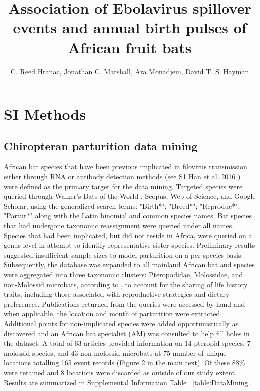 \documentclass[9pt,twoside,lineno]{pnas-new}
\title{Association of Ebolavirus spillover events and annual birth pulses of African fruit bats}
\author{C. Reed Hranac, Jonathan C. Marshall, Ara Monadjem, David T. S. Hayman}
\begin{document}

\maketitle

\SItext


\section*{SI Methods}
\label{SI methods}

\subsection*{Chiropteran parturition data mining}
\label{dataMining}
African bat species that have been previous implicated in filovirus transmission either through RNA or antibody detection methods (see S1 Han et al. 2016 \cite{Han2016UndiscoveredFiloviruses,Walsh2005Wave-likeZaire}) were defined as the primary target for the data mining.
Targeted species were queried through Walker's Bats of the World \cite{Nowak1994WalkersWorld}, Scopus, Web of Science, and Google Scholar, using the generalized search terms: "Birth*"; "Breed*"; "Reproduc*"; "Partur*" along with the Latin binomial and common species names.
Bat species that had undergone taxonomic reassignment were queried under all names. Species that had been implicated, but did not reside in Africa, were queried on a genus level in attempt to identify representative sister species.
Preliminary results suggested insufficient sample sizes to model parturition on a per-species basis. Subsequently, the database was expanded to all mainland African bat and species were aggregated into three taxonomic clusters: Pteropodidae, Molossidae, and non-Molossid microbats, according to \cite{Cumming1997RainfallBats}, to account for the sharing of life history traits, including those associated with reproductive strategies and dietary preferences.
Publications returned from the queries were accessed by hand and when applicable, the location and month of parturition were extracted. Additional points for non-implicated species were added opportunistically as discovered and an African bat specialist (AM) was consulted to help fill holes in the dataset.
A total of 63 articles provided information on 14 pteropid species, 7 molossid species, and 43 non-molossid microbats at 75 number of unique locations totalling 165 event records (Figure 2 in the main text). Of these 88\% were retained and 8 locations were discarded as outside of our study extent.
Results are summarized in Supplemental Information Table ~\ref{table:DataMining}.\par
\end{document}
